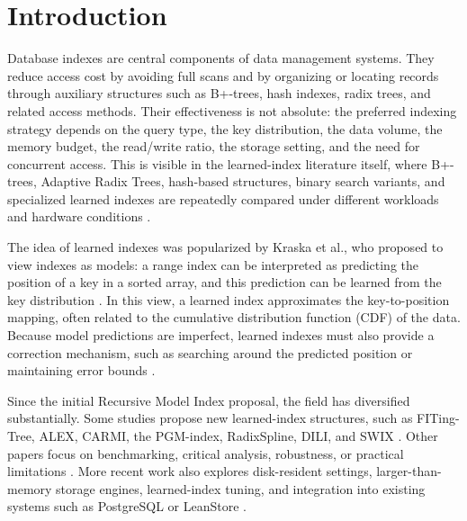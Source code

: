 \documentclass[a4paper, 12pt, twoside]{report}
\begin{document}
\tableofcontents

\chapter{Introduction}

Database indexes are central components of data management systems. They reduce access cost by avoiding full scans and by organizing or locating records through auxiliary structures such as B+-trees, hash indexes, radix trees, and related access methods. Their effectiveness is not absolute: the preferred indexing strategy depends on the query type, the key distribution, the data volume, the memory budget, the read/write ratio, the storage setting, and the need for concurrent access. This is visible in the learned-index literature itself, where B+-trees, Adaptive Radix Trees, hash-based structures, binary search variants, and specialized learned indexes are repeatedly compared under different workloads and hardware conditions \cite{kraska2018,marcus2020benchmarking,sun2023learned}.

The idea of learned indexes was popularized by Kraska et al., who proposed to view indexes as models: a range index can be interpreted as predicting the position of a key in a sorted array, and this prediction can be learned from the key distribution \cite{kraska2018}. In this view, a learned index approximates the key-to-position mapping, often related to the cumulative distribution function (CDF) of the data. Because model predictions are imperfect, learned indexes must also provide a correction mechanism, such as searching around the predicted position or maintaining error bounds \cite{kraska2018,ding2020alex,sun2023learned,maltry2022critical}.

Since the initial Recursive Model Index proposal, the field has diversified substantially. Some studies propose new learned-index structures, such as FITing-Tree, ALEX, CARMI, the PGM-index, RadixSpline, DILI, and SWIX \cite{galakatos2019fiting,ding2020alex,zhang2022carmi,ferragina2020pgm,kipf2020radixspline,li2023dili,liang2024swix}. Other papers focus on benchmarking, critical analysis, robustness, or practical limitations \cite{marcus2020benchmarking,maltry2022critical,wongkham2022ready,sun2023learned,luo2025robustness}. More recent work also explores disk-resident settings, larger-than-memory storage engines, learned-index tuning, and integration into existing systems such as PostgreSQL or LeanStore \cite{lan2023disk,chatterjee2024limousine,wang2025tuning,fuad2026postlearn,maharjan2023learnedstore}.
\end{document}
